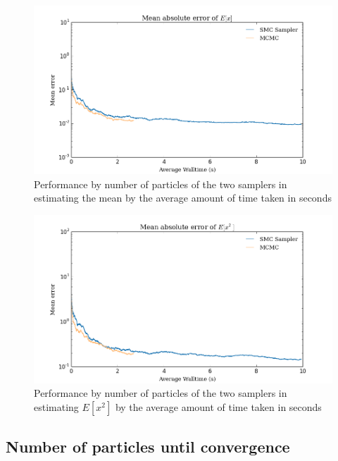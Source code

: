 \documentclass[12pt]{elsarticle}
\begin{document}
\begin{figure}[htbp]
\begin{center}
\includegraphics[width = \textwidth]{plots/E_X_walltime.png}
\caption{Performance by number of particles of the two samplers in estimating the mean by the average amount of time taken in seconds}
\label{ex}
\end{center}
\end{figure}

\begin{figure}[htbp]
\begin{center}
\includegraphics[width = \textwidth]{plots/E_X2_walltime.png}
\caption{Performance by number of particles of the two samplers in estimating $E[x^2]$ by the average amount of time taken in seconds}
\label{ex2}
\end{center}
\end{figure}

\subsection*{Number of particles until convergence }
\end{document}
